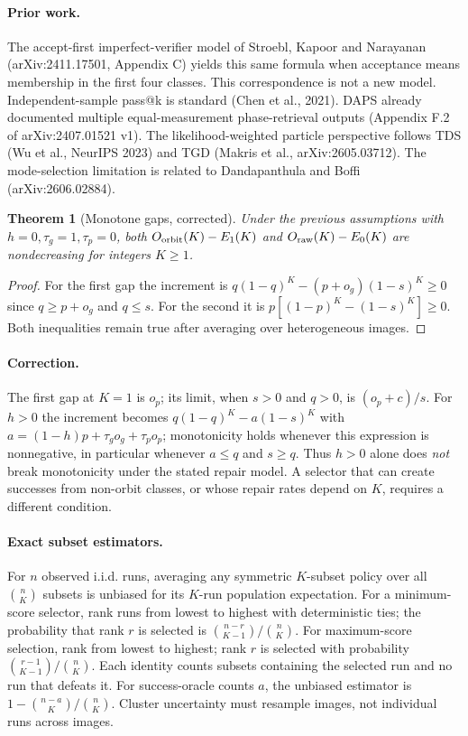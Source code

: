 \documentclass[11pt]{article}
\newtheorem{theorem}{Theorem}
\begin{document}
\paragraph{Prior work.} The accept-first imperfect-verifier model of Stroebl, Kapoor and Narayanan (arXiv:2411.17501, Appendix C) yields this same formula when acceptance means membership in the first four classes. This correspondence is not a new model. Independent-sample pass@k is standard (Chen et al., 2021). DAPS already documented multiple equal-measurement phase-retrieval outputs (Appendix F.2 of arXiv:2407.01521 v1). The likelihood-weighted particle perspective follows TDS (Wu et al., NeurIPS 2023) and TGD (Makris et al., arXiv:2605.03712). The mode-selection limitation is related to Dandapanthula and Boffi (arXiv:2606.02884).
\begin{theorem}[Monotone gaps, corrected]
Under the previous assumptions with $h=0,\tau_g=1,\tau_p=0$, both $O_{\rm orbit}(K)-E_1(K)$ and $O_{\rm raw}(K)-E_0(K)$ are nondecreasing for integers $K\geq1$.
\end{theorem}
\begin{proof}
For the first gap the increment is
$q(1-q)^K-(p+o_g)(1-s)^K\geq0$ since $q\geq p+o_g$ and $q\leq s$.
For the second it is $p[(1-p)^K-(1-s)^K]\geq0$.
Both inequalities remain true after averaging over heterogeneous images.
\end{proof}
\paragraph{Correction.} The first gap at $K=1$ is $o_p$; its limit, when $s>0$ and $q>0$, is $(o_p+c)/s$. For $h>0$ the increment becomes $q(1-q)^K-a(1-s)^K$ with $a=(1-h)p+\tau_go_g+\tau_po_p$; monotonicity holds whenever this expression is nonnegative, in particular whenever $a\leq q$ and $s\geq q$. Thus $h>0$ alone does \emph{not} break monotonicity under the stated repair model. A selector that can create successes from non-orbit classes, or whose repair rates depend on $K$, requires a different condition.
\paragraph{Exact subset estimators.} For $n$ observed i.i.d. runs, averaging any symmetric $K$-subset policy over all $\binom nK$ subsets is unbiased for its $K$-run population expectation. For a minimum-score selector, rank runs from lowest to highest with deterministic ties; the probability that rank $r$ is selected is $\binom{n-r}{K-1}/\binom nK$. For maximum-score selection, rank from lowest to highest; rank $r$ is selected with probability $\binom{r-1}{K-1}/\binom nK$. Each identity counts subsets containing the selected run and no run that defeats it. For success-oracle counts $a$, the unbiased estimator is $1-\binom{n-a}K/\binom nK$. Cluster uncertainty must resample images, not individual runs across images.
\end{document}

